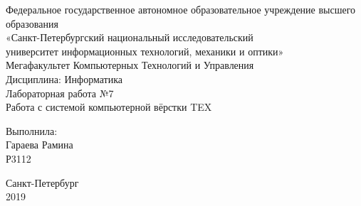\begin{center}
	Федеральное государственное автономное образовательное учреждение высшего образования \\
	«Санкт-Петербургский национальный исследовательский \\
	университет информационных технологий, механики и оптики»\\
	\vspace{1cm}
	Мегафакультет Компьютерных Технологий и Управления \\
	Дисциплина: Информатика \\
	\vspace{5cm}
	Лабораторная работа №7 \\
	Работа с системой компьютерной вёрстки TEX
	\vspace{10cm}
\end{center}

\begin{flushright}
	Выполнила:\\
	Гараева Рамина\\
	Р3112 \\
\end{flushright}

\null\vfill

\begin{center}
	Санкт-Петербург \\ 
	2019
\end{center}